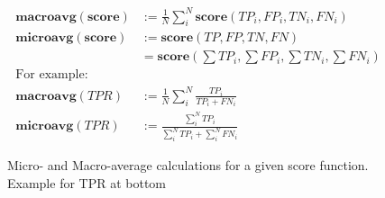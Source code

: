 \begin{figure}[H]
	\begin{equation}
		\begin{aligned}
			\mathbf{macroavg}(\mathbf{score}) &:=\frac{1}{N}\sum_{i}^{N}\mathbf{score}(TP_i, FP_i, TN_i, FN_i)\\
			\mathbf{microavg}(\mathbf{score}) &:=\mathbf{score}(\mathit{TP}, \mathit{FP}, \mathit{TN}, \mathit{FN})\\
			&=\mathbf{score}(\sum \mathit{TP_i}, \sum \mathit{FP_i}, \sum \mathit{TN_i}, \sum \mathit{FN_i})\\
			\text{For example:}\\
			\mathbf{macroavg}(\mathit{TPR}) &:=\frac{1}{N}\sum_{i}^{N}\frac{\mathit{TP_i}}{\mathit{TP_i}+\mathit{FN_i}}\\
			\mathbf{microavg}(\mathit{TPR}) &:=\frac{\sum_{i}^{N}\mathit{TP_i}}{\sum_{i}^{N}\mathit{TP_i}+\sum_{i}^{N}\mathit{FN_i}}
		\end{aligned}
	\end{equation}
	\caption{Micro- and Macro-average calculations for a given score function. Example for TPR at bottom}
	\label{metrics-avg}
\end{figure}

